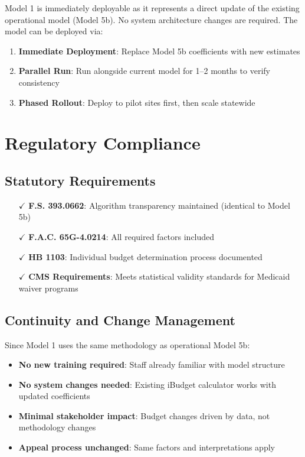 Model 1 is immediately deployable as it represents a direct update of the existing operational model (Model 5b). No system architecture changes are required. The model can be deployed via:

\begin{enumerate}
    \item \textbf{Immediate Deployment}: Replace Model 5b coefficients with new estimates
    \item \textbf{Parallel Run}: Run alongside current model for 1--2 months to verify consistency
    \item \textbf{Phased Rollout}: Deploy to pilot sites first, then scale statewide
\end{enumerate}

\section{Regulatory Compliance}

\subsection{Statutory Requirements}

\begin{itemize}
    \item[$\checkmark$] \textbf{F.S. 393.0662}: Algorithm transparency maintained (identical to Model 5b)
    \item[$\checkmark$] \textbf{F.A.C. 65G-4.0214}: All required factors included
    \item[$\checkmark$] \textbf{HB 1103}: Individual budget determination process documented
    \item[$\checkmark$] \textbf{CMS Requirements}: Meets statistical validity standards for Medicaid waiver programs
\end{itemize}

\subsection{Continuity and Change Management}

Since Model 1 uses the same methodology as operational Model 5b:
\begin{itemize}
    \item \textbf{No new training required}: Staff already familiar with model structure
    \item \textbf{No system changes needed}: Existing iBudget calculator works with updated coefficients
    \item \textbf{Minimal stakeholder impact}: Budget changes driven by data, not methodology changes
    \item \textbf{Appeal process unchanged}: Same factors and interpretations apply
\end{itemize}

